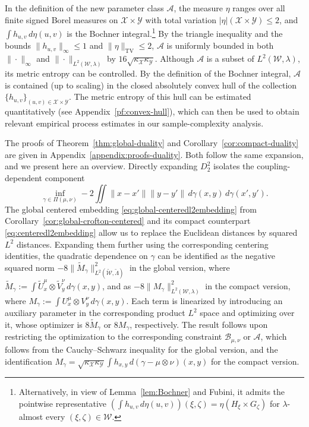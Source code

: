 \documentclass[11pt]{amsart}
\theoremstyle{definition}
\theoremstyle{remark}
\newcommand{\cA}{\mathcal{A}}
\newcommand{\1}{\mathbf{1}}
\numberwithin{equation}{section}
\newcommand{\TV}{\mathrm{TV}}
\begin{document}
In the definition of the new parameter class $\cA$, the measure $\eta$ ranges over all finite
signed Borel measures on $\mathcal X\times\mathcal Y$ with total
variation $|\eta|(\mathcal X\times\mathcal Y)\leq2$, and
$\int h_{u,v}\,d\eta(u,v)$ is the Bochner integral.\footnote{Alternatively, in view of
Lemma~\ref{lem:Bochner} and Fubini, it admits the pointwise
representative $
\left(\int h_{u,v}\,d\eta(u,v)\right)(\xi,\zeta)
=
\eta(H_\xi\times G_\zeta)$ for $\lambda$-almost every $(\xi,\zeta)\in\mathcal W$.} 
By the triangle inequality and the bounds
$\|h_{u,v}\|_\infty\leq1$ and $\|\eta\|_{\TV}\leq2$, $\cA$ is
uniformly bounded in both $\|\cdot\|_\infty$ and
$\|\cdot\|_{L^2(\mathcal W,\lambda)}$ by
$16\sqrt{\kappa_{\mathcal X}\kappa_{\mathcal Y}}$. Although $\mathcal{A}$ is a subset of $L^2(\mathcal{W}, \lambda)$, its metric entropy can be controlled. By the
definition of the Bochner integral, $\mathcal{A}$ is contained (up to scaling) in the closed absolutely convex hull
of the collection $\{h_{u,v}\}_{(u,v)\in\mathcal{X}\times\mathcal{Y}}$. The metric entropy of this hull can be estimated quantitatively
(see Appendix~\ref{pf:convex-hull}), which can then be used to obtain relevant empirical process estimates in our
sample-complexity analysis.

The proofs of Theorem~\ref{thm:global-duality}
and Corollary~\ref{cor:compact-duality} are given in
Appendix~\ref{appendix:proofs-duality}. Both follow the same expansion, and we
present here an overview. Directly expanding $D_2^2$ isolates the
coupling-dependent component
\[
\inf_{\gamma\in\Pi(\mu,\nu)}
-2\iint
\|x-x'\|\|y-y'\|
\,d\gamma(x,y)\,d\gamma(x',y').
\]
The global centered embedding \eqref{eq:global-centeredl2embedding} from
Corollary~\ref{cor:global-crofton-centered} and its compact counterpart
\eqref{eq:centeredl2embedding} allow us to replace the Euclidean
distances by squared $L^2$
distances. Expanding them further using the corresponding centering identities, the quadratic dependence on $\gamma$ can be
identified as the negative squared norm $-8\|\widetilde M_\gamma\|^2_{L^2(\widetilde{\mathcal W},\widetilde\Lambda)}$ in the global version, where
$\widetilde M_\gamma:=\int \widetilde U_x^\mu\otimes \widetilde V_y^\nu\,d\gamma(x,y)$, and as $-8\|M_\gamma\|^2_{L^2(\mathcal W,\lambda)}$ in the compact version, where
$M_\gamma:=\int U_x^\mu\otimes V_y^\nu\,d\gamma(x,y)$. Each term is linearized by introducing an auxiliary
parameter in the corresponding product $L^2$ space and optimizing over
it, whose optimizer is $8\widetilde M_\gamma$ or $8M_\gamma$, respectively. The result follows upon restricting the optimization to the corresponding constraint $\mathcal B_{\mu, \nu}$ or $\mathcal{A}$, which follows from the Cauchy--Schwarz inequality for the global version, and the identification
$M_\gamma
=
\sqrt{\kappa_{\mathcal X}\kappa_{\mathcal Y}}
\int h_{x,y}\,d(\gamma-\mu\otimes\nu)(x,y)$ for the compact version.
\end{document}
